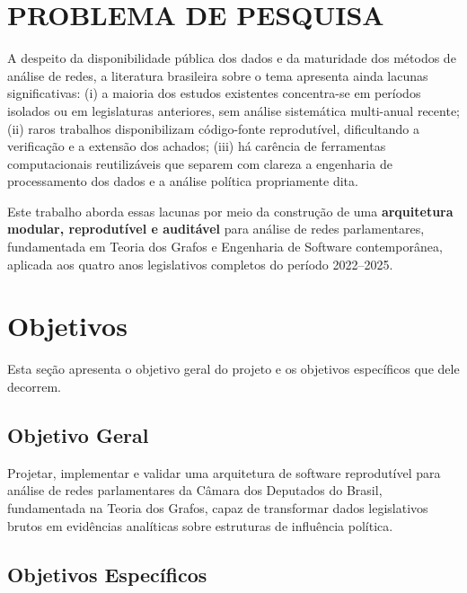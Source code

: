 \documentclass[
      12pt,
      a4paper,
      openright,
      oneside,
      chapter=TITLE,
      section=TITLE,
      english,
      french,
      spanish,
      brazilian
    ]{abntex2}
\begin{document}
    \section{PROBLEMA DE PESQUISA}
    
    A despeito da disponibilidade pública dos dados e da maturidade dos métodos de análise de redes, a literatura brasileira sobre o tema apresenta ainda lacunas significativas: (i) a maioria dos estudos existentes concentra-se em períodos isolados ou em legislaturas anteriores, sem análise sistemática multi-anual recente; (ii) raros trabalhos disponibilizam código-fonte reprodutível, dificultando a verificação e a extensão dos achados; (iii) há carência de ferramentas computacionais reutilizáveis que separem com clareza a engenharia de processamento dos dados e a análise política propriamente dita.
    
    Este trabalho aborda essas lacunas por meio da construção de uma \textbf{arquitetura modular, reprodutível e auditável} para análise de redes parlamentares, fundamentada em Teoria dos Grafos e Engenharia de Software contemporânea, aplicada aos quatro anos legislativos completos do período 2022--2025.
    
    \section{Objetivos}
    Esta seção apresenta o objetivo geral do projeto e os objetivos específicos que dele decorrem.
    
    \subsection{Objetivo Geral}
    
    Projetar, implementar e validar uma arquitetura de software reprodutível para análise de redes parlamentares da Câmara dos Deputados do Brasil, fundamentada na Teoria dos Grafos, capaz de transformar dados legislativos brutos em evidências analíticas sobre estruturas de influência política.
    
    \subsection{Objetivos Específicos}
    
\end{document}
